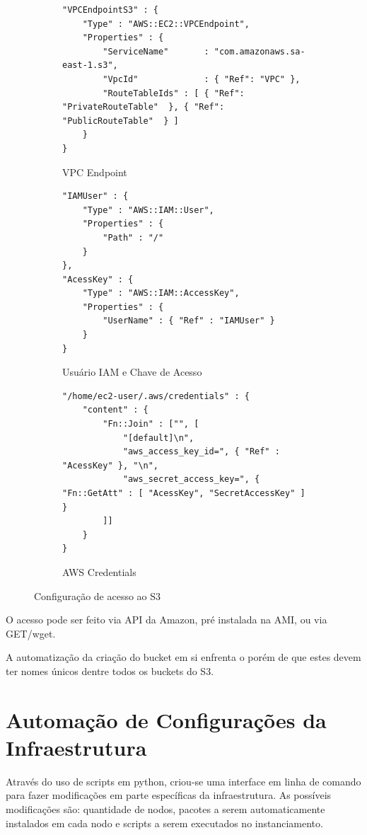 \documentclass[tg]{mdtufsm}
\begin{document}
\begin{figure}
\centering

\begin{subfigure}[c]{1\textwidth}
\begin{lstlisting}[frame=single, numbers=none]
"VPCEndpointS3" : {
	"Type" : "AWS::EC2::VPCEndpoint",
	"Properties" : {
		"ServiceName"		: "com.amazonaws.sa-east-1.s3",
		"VpcId"				: { "Ref": "VPC" },
		"RouteTableIds"	: [ { "Ref": "PrivateRouteTable"  }, { "Ref": "PublicRouteTable"  } ]
	}
}
\end{lstlisting}
\caption{VPC Endpoint}
\label{vpcEndpoint}
\end{subfigure}

\begin{subfigure}[c]{1\textwidth}
\begin{lstlisting}[frame=single, numbers=none]
"IAMUser" : {
	"Type" : "AWS::IAM::User",
	"Properties" : {
		"Path" : "/"
	}
},		
"AcessKey" : {
	"Type" : "AWS::IAM::AccessKey",
	"Properties" : {
		"UserName" : { "Ref" : "IAMUser" }
	}
} 
\end{lstlisting}
\caption{Usuário IAM e Chave de Acesso}
\label{accessKey}
\end{subfigure}

\begin{subfigure}[c]{1\textwidth}
\begin{lstlisting}[frame=single, numbers=none]
"/home/ec2-user/.aws/credentials" : {
	"content" : {
		"Fn::Join" : ["", [
			"[default]\n",
			"aws_access_key_id=", { "Ref" : "AcessKey" }, "\n",
			"aws_secret_access_key=", { "Fn::GetAtt" : [ "AcessKey", "SecretAccessKey" ] }					
		]]
	}
}
\end{lstlisting}
\caption{AWS Credentials}
\label{awsCredentials}
\end{subfigure}
\caption{Configuração de acesso ao S3}
\end{figure}

O acesso pode ser feito via API da Amazon, pré instalada na AMI, ou via GET/wget.

A automatização da criação do bucket em si enfrenta o porém de que estes devem ter nomes únicos dentre todos os buckets do S3.


\section{Automação de Configurações da Infraestrutura}

Através do uso de scripts em python, criou-se uma interface em linha de comando para fazer modificações em parte específicas da infraestrutura. As possíveis modificações são: quantidade de nodos, pacotes a serem automaticamente instalados em cada nodo e scripts a serem executados no instanciamento.
\end{document}

